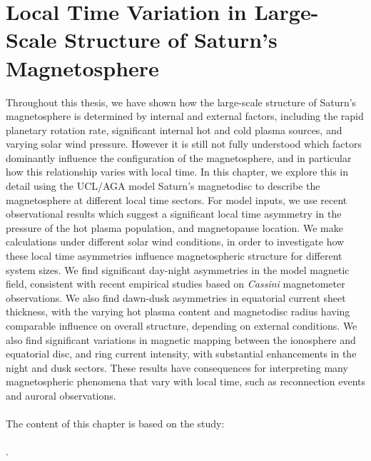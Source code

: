 \chapter[Local Time Variation in Large-Scale Structure of Saturn's Magnetosphere]{Local Time Variation in Large-Scale Structure of Saturn's Magnetosphere}
\label{chap:LTsectors}
Throughout this thesis, we have shown how the large-scale structure of Saturn's magnetosphere is determined by internal and external factors, including the rapid planetary rotation rate, significant internal hot and cold plasma sources, and varying solar wind pressure. However it is still not fully understood which factors dominantly influence the configuration of the magnetosphere, and in particular how this relationship varies with local time. In this chapter, we explore this in detail using the UCL/AGA model Saturn's magnetodisc to describe the magnetosphere at different local time sectors. For model inputs, we use recent observational results which suggest a significant local time asymmetry in the pressure of the hot plasma population, and magnetopause location. We make calculations under different solar wind conditions, in order to investigate how these local time asymmetries influence magnetospheric structure for different system sizes. We find significant day-night asymmetries in the model magnetic field, consistent with recent empirical studies based on \textit{Cassini} magnetometer observations. We also find dawn-dusk asymmetries in equatorial current sheet thickness, with the varying hot plasma content and magnetodisc radius having comparable influence on overall structure, depending on external conditions. We also find significant variations in magnetic mapping between the ionosphere and equatorial disc, and ring current intensity, with substantial enhancements in the night and dusk sectors. These results have consequences for interpreting many magnetospheric phenomena that vary with local time, such as reconnection events and auroral observations. \\
\\
The content of this chapter is based on the study: \\
\\
. 

